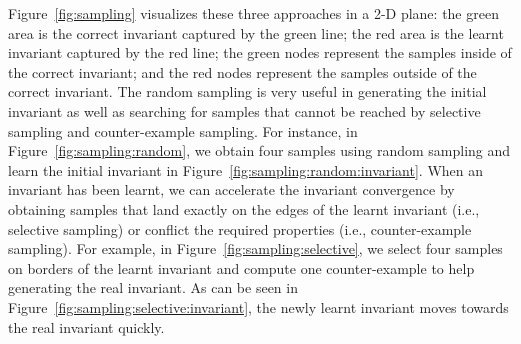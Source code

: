 Figure~\ref{fig:sampling} visualizes these three approaches in a 2-D plane: 
the green area is the correct invariant captured by the green line; 
the red area is the learnt invariant captured by the red line; 
the green nodes represent the samples inside of the correct invariant; 
and the red nodes represent the samples outside of the correct invariant. 
The random sampling is very useful in generating the initial invariant 
as well as searching for samples that cannot be reached 
by selective sampling and counter-example sampling. 
For instance, in Figure~\ref{fig:sampling:random}, 
we obtain four samples using random sampling 
and learn the initial invariant in Figure~\ref{fig:sampling:random:invariant}. 
When an invariant has been learnt, 
we can accelerate the invariant convergence by obtaining samples that 
land exactly on the edges of the learnt invariant (i.e., selective sampling) 
or conflict the required properties (i.e., counter-example sampling). 
For example, in Figure~\ref{fig:sampling:selective}, 
we select four samples on borders of the learnt invariant and 
compute one counter-example to help generating the real invariant. 
As can be seen in Figure~\ref{fig:sampling:selective:invariant}, 
the newly learnt invariant moves towards the real invariant quickly. 

